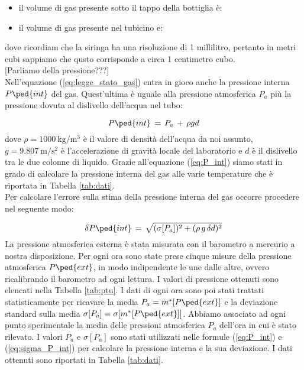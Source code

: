 \begin{itemize}
	\item{il volume di gas presente sotto il tappo della bottiglia è: }
	\item{il volume di gas presente nel tubicino e: }
\end{itemize}
%
dove ricordiam che la siringa ha una risoluzione di 1 millilitro, pertanto in metri cubi sappiamo che qusto corrisponde a circa 1 centimetro cubo.\\

[Parliamo della pressione???]\\

Nell'equazione (\ref{eq:legge_stato_gas}) entra in gioco anche la pressione interna $P\ped{int}$ del gas. Quest'ultima è uguale alla pressione atmosferica $P_a$ più la pressione dovuta al dislivello dell'acqua nel tubo:

\begin{equation}
	P\ped{int} \,=\, P_a \,+\, \rho  g  d
	\label{eq:P_int}
\end{equation}
%
dove $\rho = \SI{1000}{\kilo\gram\per\cubic\metre}$ è il valore di densità dell'acqua da noi assunto, $g = \SI{9.807}{\meter\per\square\second}$ è l'accelerazione di gravità locale del laboratorio e $d$ è il dislivello tra le due colonne di liquido. Grazie all'equazione (\ref{eq:P_int}) siamo stati in grado di calcolare la pressione interna del gas alle varie temperature che è riportata in Tabella \ref{tab:dati}.\\
Per calcolare l'errore sulla stima della pressione interna del gas occorre procedere nel seguente modo:

\begin{equation}
	\delta P\ped{int} \,=\, \sqrt{(\sigma [P_a])^2 + (\rho\,g\,\delta d)^2}
	\label{eq:sigma_P_int}
\end{equation}
%
La pressione atmosferica esterna è stata misurata con il barometro a mercurio a nostra disposizione. Per ogni ora sono state prese cinque misure della pressione atmosferica $P\ped{ext}$, in modo indipendente le une dalle altre, ovvero ricalibrando il barometro ad ogni lettura. I valori di pressione ottenuti sono elencati nella Tabella \ref{tab:ptu}. I dati di ogni ora sono poi stati trattati statisticamente per ricavare la media $P_a = m^*[P\ped{ext}]$ e la deviazione standard sulla media $\sigma [P_a] = \sigma[m^*[P\ped{ext}]]$. Abbiamo associato ad ogni punto sperimentale la media delle pressioni atmosferica $P_a$ dell'ora in cui è stato rilevato. I valori $P_a$ e $\sigma[P_a]$ sono stati utilizzati nelle formule (\ref{eq:P_int}) e (\ref{eq:sigma_P_int}) per calcolare la pressione
interna e la sua deviazione. I dati ottenuti sono riportati in Tabella \ref{tab:dati}.


